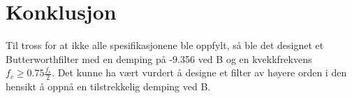 \section{Konklusjon}
\label{sec:conclusion}

Til tross for at ikke alle spesifikasjonene ble oppfylt, så ble det designet et Butterworthfilter med en demping på -9.356 ved B og en kvekkfrekvens $f_c\geq 0.75\frac{f_s}{2}$. Det kunne ha vært vurdert å designe et filter av høyere orden i den hensikt å oppnå en tilstrekkelig demping ved B.